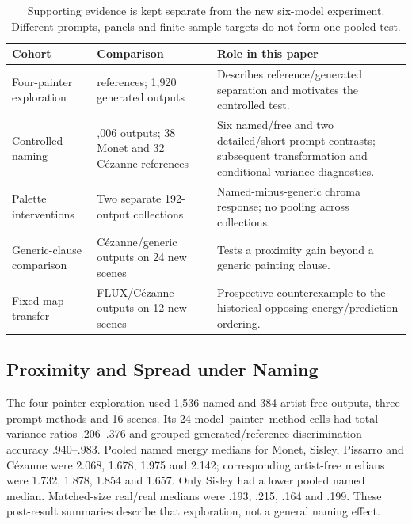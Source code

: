 \begin{table}[htbp]
\caption{Supporting evidence is kept separate from the new six-model experiment.
Different prompts, panels and finite-sample targets do not form one pooled test.}
\label{tab:cohorts}

\centering\small
\begin{tabularx}{\linewidth}{@{}>{\raggedright\arraybackslash}p{.22\linewidth}>{\raggedright\arraybackslash}p{.27\linewidth}>{\raggedright\arraybackslash}X@{}}
\toprule
Cohort & Comparison & Role in this paper\\
\midrule
Four-painter exploration & 649 references; 1,920 generated outputs &
Describes reference/generated separation and motivates the controlled test.\\[4pt]
Controlled naming & 1,006 outputs; 38 Monet and 32 C\'ezanne references &
Six named/free and two detailed/short prompt contrasts; subsequent transformation
and conditional-variance diagnostics.\\[4pt]
Palette interventions & Two separate 192-output collections &
Named-minus-generic chroma response; no pooling across collections.\\[4pt]
Generic-clause comparison & 96 C\'ezanne/generic outputs on 24 new scenes &
Tests a proximity gain beyond a generic painting clause.\\[4pt]
Fixed-map transfer & 240 FLUX/C\'ezanne outputs on 12 new scenes &
Prospective counterexample to the historical opposing energy/prediction ordering.\\
\bottomrule
\end{tabularx}


\end{table}

\subsection{Proximity and Spread under Naming}
The four-painter exploration used 1,536 named and 384 artist-free outputs,
three prompt methods and 16 scenes. Its 24 model--painter--method cells had
total variance ratios .206--.376 and grouped generated/reference discrimination accuracy
.940--.983. Pooled named energy medians for Monet, Sisley, Pissarro and C\'ezanne
were 2.068, 1.678, 1.975 and 2.142; corresponding artist-free medians were
1.732, 1.878, 1.854 and 1.657. Only Sisley had a lower pooled named median.
Matched-size real/real medians were .193, .215, .164 and .199. These post-result
summaries describe that exploration, not a general naming effect.

